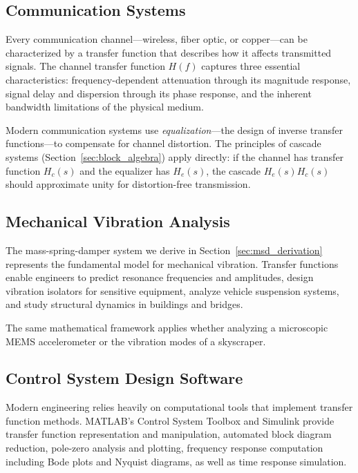\subsection{Communication Systems}

Every communication channel---wireless, fiber optic, or copper---can be characterized by a transfer function that describes how it affects transmitted signals. The channel transfer function $H(f)$ captures three essential characteristics: frequency-dependent attenuation through its magnitude response, signal delay and dispersion through its phase response, and the inherent bandwidth limitations of the physical medium.

Modern communication systems use \textit{equalization}---the design of inverse transfer functions---to compensate for channel distortion. The principles of cascade systems (Section~\ref{sec:block_algebra}) apply directly: if the channel has transfer function $H_c(s)$ and the equalizer has $H_e(s)$, the cascade $H_e(s)H_c(s)$ should approximate unity for distortion-free transmission.

\subsection{Mechanical Vibration Analysis}

The mass-spring-damper system we derive in Section~\ref{sec:msd_derivation} represents the fundamental model for mechanical vibration. Transfer functions enable engineers to predict resonance frequencies and amplitudes, design vibration isolators for sensitive equipment, analyze vehicle suspension systems, and study structural dynamics in buildings and bridges.

The same mathematical framework applies whether analyzing a microscopic MEMS accelerometer or the vibration modes of a skyscraper.

\subsection{Control System Design Software}

Modern engineering relies heavily on computational tools that implement transfer function methods. MATLAB's Control System Toolbox and Simulink provide transfer function representation and manipulation, automated block diagram reduction, pole-zero analysis and plotting, frequency response computation including Bode plots and Nyquist diagrams, as well as time response simulation.

